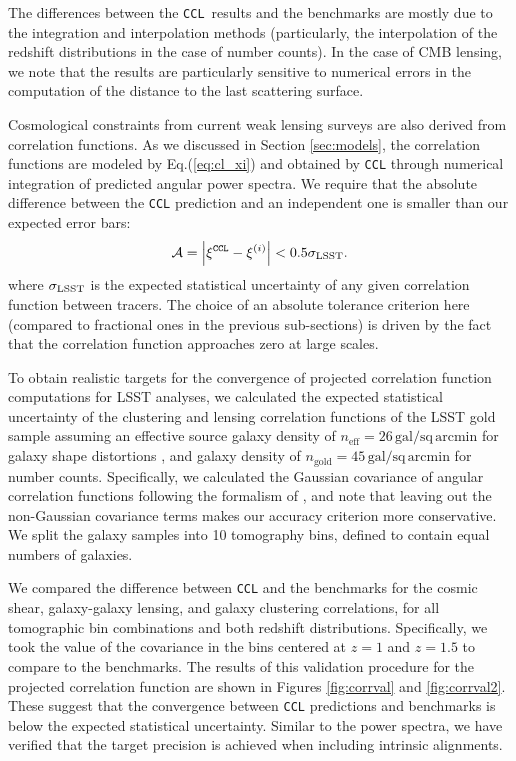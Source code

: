 \documentclass[\docopts]{\docclass}
\newcommand{\ccl}{{\tt CCL}\xspace}
\begin{document}
The differences between the \ccl~results and the benchmarks are mostly due to the integration and interpolation methods (particularly, the interpolation of the redshift distributions in the case of number counts). In the case of CMB lensing, we note that the results are particularly sensitive to numerical errors in the computation of the distance to the last scattering surface.

Cosmological constraints from current weak lensing surveys are also derived from correlation functions. As we discussed in Section \ref{sec:models}, the correlation functions are modeled by Eq.(\ref{eq:cl_xi}) and obtained by \ccl through numerical integration of predicted angular power spectra. We require that the absolute difference between the \ccl prediction and an independent one is smaller than our expected error bars:
\begin{equation}
  \mathcal{A}=\left|\xi^{\tt CCL}-\xi^{(i)}\right|<0.5\sigma_{\rm LSST}.
\end{equation}
where $\sigma_{\rm LSST}$ is the expected statistical uncertainty of any given correlation function between tracers. The choice of an absolute tolerance criterion here (compared to fractional ones in the previous sub-sections) is driven by the fact that the correlation function approaches zero at large scales.

To obtain realistic targets for the convergence of projected correlation function computations for LSST analyses, we calculated the expected statistical uncertainty of the clustering and lensing correlation functions of the LSST gold sample \citep{LSSTSB} assuming an effective source galaxy density of $n_\mathrm{eff} = 26\,\mathrm{gal/sq\,arcmin}$ for galaxy shape distortions \citep{Chang13}, and galaxy density of $n_\mathrm{gold} = 45\,\mathrm{gal/sq\,arcmin}$ for number counts. Specifically, we calculated the Gaussian covariance of angular correlation functions following the formalism of \citet{2008A&A...477...43J}, and note that leaving out the non-Gaussian covariance terms makes our accuracy criterion more conservative. We split the galaxy samples into 10 tomography bins, defined to contain equal numbers of galaxies.

We compared the difference between \ccl and the benchmarks for the cosmic shear, galaxy-galaxy lensing, and galaxy clustering correlations, for all tomographic bin combinations and both redshift distributions. Specifically, we took the value of the covariance in the bins centered at $z=1$ and $z=1.5$ to compare to the benchmarks. The results of this validation procedure for the projected correlation function are shown in Figures \ref{fig:corrval} and \ref{fig:corrval2}. These suggest that the convergence between \ccl predictions and benchmarks is below the expected statistical uncertainty. Similar to the power spectra, we have verified that the target precision is achieved when including intrinsic alignments.
\end{document}
